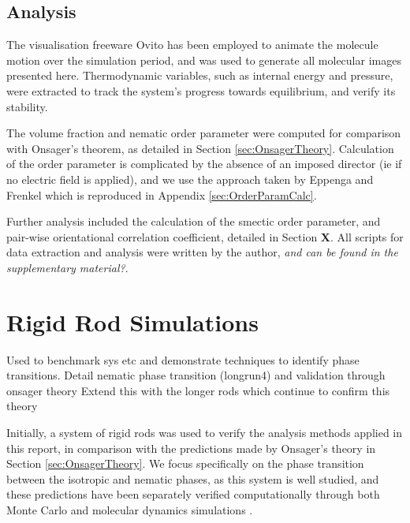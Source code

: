\documentclass[11pt, a4paper]{article} %
\begin{document}
 
\subsection{Analysis}

The visualisation freeware Ovito \cite{Ovito} has been employed to animate the molecule motion over the simulation period, and was used to generate all molecular images presented here. Thermodynamic variables, such as internal energy and pressure, were extracted to track the system's progress towards equilibrium, and verify its stability.

The volume fraction and nematic order parameter were computed for comparison with Onsager's theorem, as detailed in Section \ref{sec:OnsagerTheory}. Calculation of the order parameter is complicated by the absence of an imposed director (ie if no electric field is applied), and we use the approach taken by Eppenga and Frenkel \cite{Eppenga1984} which is reproduced in Appendix \ref{sec:OrderParamCalc}. %

Further analysis included the calculation of the smectic order parameter, and pair-wise orientational correlation coefficient, detailed in Section \textbf{X}. All scripts for data extraction and analysis were written by the author, \textit{and can be found in the supplementary material?}.



\section{Rigid Rod Simulations}
Used to benchmark sys etc and demonstrate techniques to identify phase transitions.
Detail nematic phase transition (longrun4) and validation through onsager theory
Extend this with the longer rods which continue to confirm this theory

Initially, a system of rigid rods was used to verify the analysis methods applied in this report, in comparison with the predictions made by Onsager's theory in Section \ref{sec:OnsagerTheory}. We focus specifically on the phase transition between the isotropic and nematic phases, as this system is well studied, and these predictions have been separately verified computationally through both Monte Carlo \cite{Frenkel1984, Lee1987} and molecular dynamics simulations \cite{Allen1987, Camp1996}.
\end{document}
